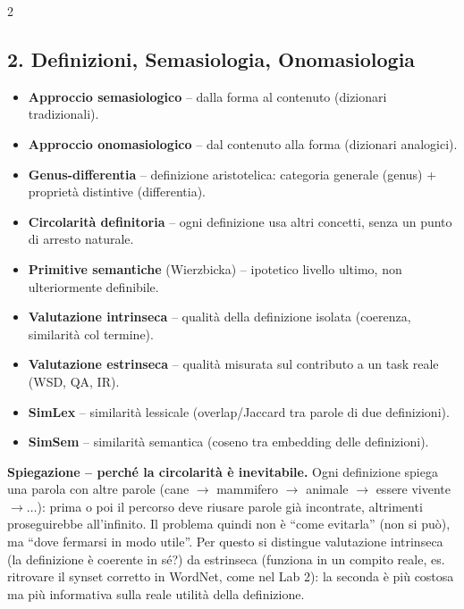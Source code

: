 \documentclass[10pt,a4paper]{extarticle}
\begin{document}
\begin{multicols}{2}
\subsection*{2. Definizioni, Semasiologia, Onomasiologia}
\begin{itemize}
\item \textbf{Approccio semasiologico} -- dalla forma al contenuto (dizionari tradizionali).
\item \textbf{Approccio onomasiologico} -- dal contenuto alla forma (dizionari analogici).
\item \textbf{Genus-differentia} -- definizione aristotelica: categoria generale (genus) + propriet\`a distintive (differentia).
\item \textbf{Circolarit\`a definitoria} -- ogni definizione usa altri concetti, senza un punto di arresto naturale.
\item \textbf{Primitive semantiche} (Wierzbicka) -- ipotetico livello ultimo, non ulteriormente definibile.
\item \textbf{Valutazione intrinseca} -- qualit\`a della definizione isolata (coerenza, similarit\`a col termine).
\item \textbf{Valutazione estrinseca} -- qualit\`a misurata sul contributo a un task reale (WSD, QA, IR).
\item \textbf{SimLex} -- similarit\`a lessicale (overlap/Jaccard tra parole di due definizioni).
\item \textbf{SimSem} -- similarit\`a semantica (coseno tra embedding delle definizioni).
\end{itemize}
\smallskip\noindent\textbf{\textcolor{blue!45!black}{Spiegazione -- perch\'e la circolarit\`a \`e inevitabile.}} Ogni definizione spiega una parola con altre parole (cane $\to$ mammifero $\to$ animale $\to$ essere vivente $\to \ldots$): prima o poi il percorso deve riusare parole gi\`a incontrate, altrimenti proseguirebbe all'infinito. Il problema quindi non \`e ``come evitarla'' (non si pu\`o), ma ``dove fermarsi in modo utile''. Per questo si distingue valutazione intrinseca (la definizione \`e coerente in s\'e?) da estrinseca (funziona in un compito reale, es. ritrovare il synset corretto in WordNet, come nel Lab 2): la seconda \`e pi\`u costosa ma pi\`u informativa sulla reale utilit\`a della definizione.


\end{multicols}
\end{document}
